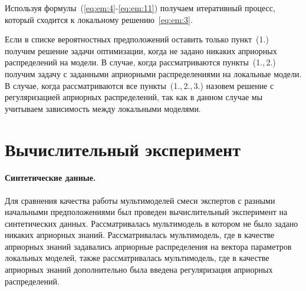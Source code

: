 \documentclass[12pt, twoside]{article}
\numberwithin{equation}{section}
\begin{document}
Используя формулы~(\ref{eq:em:4}-\ref{eq:em:11}) получаем итеративный процесс, который сходится к локальному решению~\eqref{eq:em:3}.

Если в списке вероятностных предположений оставить только пункт~(1.) получим решение задачи оптимизации, когда не задано никаких априорных распределений на модели. В случае, когда рассматриваются пункты~(1.,\,2.) получим задачу с заданными априорными распределениями на локальные модели.  В случае, когда рассматриваются все пункты~(1.,\,2.,\,3.) назовем решение с регуляризацией априорных распределений, так как в данном случае мы учитываем зависимость между локальными моделями.

\section{Вычислительный эксперимент}
\paragraph{Синтетические данные.}
Для сравнения качества работы мультимоделей смеси экспертов с разными начальными предположениями был проведен вычислительный эксперимент на синтетических данных. Рассматривалась мультимодель в котором не было задано никаких априорных знаний. Рассматривалась мультимодель, где в качестве априорных знаний задавались априорные распределения на вектора параметров локальных моделей, также рассматривалась мультимодель, где в качестве априорных знаний дополнительно была введена регуляризация априорных распределений.
\end{document}
